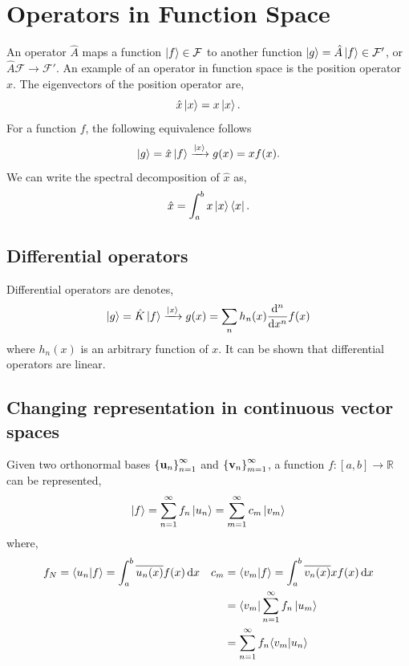 \documentclass{book}
\renewcommand{\braket}[2]{\langle#1|#2\rangle}
\begin{document}
\section{Operators in Function Space}
An operator $\hat{A}$ maps a function $\ket{f} \in \mathcal{F}$ to another function $\ket{g} = \hat{A}\ket{f} \in \mathcal{F}'$, or $\hat{A} \mathcal{F} \to \mathcal{F}'$. An example of an operator in function space is the position operator $\hat{x}$. The eigenvectors of the position operator are,
\begin{equation}
	\hat{x} \ket{x} = x \ket{x}.
\end{equation}
For a function $f$, the following equivalence follows
\begin{equation}
	\ket{g} = \hat{x}\ket{f} \xrightarrow{\ket{x}} g(x) = xf(x).
\end{equation}
We can write the spectral decomposition of $\hat{x}$ as,
\begin{equation}
	\hat{x} = \int_a^bx\ket{x}\bra{x}.
\end{equation}
\subsection{Differential operators}
Differential operators are denotes,
\begin{equation}
	\ket{g} = \hat{K}\ket{f} \xrightarrow{\ket{x}} g(x) = \sum_nh_n(x)\dv[n]{x}f(x)
\end{equation}
where $h_n(x)$ is an arbitrary function of $x$. It can be shown that differential operators are linear.
\subsection{Changing representation in continuous vector spaces}
Given two orthonormal bases $\left\{\vb{u}_n\right\}_{n=1}^{\infty}$ and $\left\{\vb{v}_n\right\}_{m=1}^{\infty}$, a function $f : \left[a,b\right] \to \mathbb{R}$ can be represented,
\begin{equation}
	\ket{f} = \sum_{n=1}^{\infty}f_n\ket{u_n} = \sum_{m=1}^{\infty}c_m\ket{v_m}
\end{equation}
where,
\begin{align}
	f_N = \braket{u_n}{f} = \int_a^b\overline{u_n(x)}f(x)\dd{x} && c_m & = \braket{v_m}{f} = \int_a^b\overline{v_n(x)}{x}f(x)\dd{x}\\
	&& & = \bra{v_m}\sum_{n=1}^{\infty}f_n\ket{u_m} \\
	&& & = \sum_{n=1}^{\infty}f_n\braket{v_m}{u_n}
\end{align}
\end{document}
